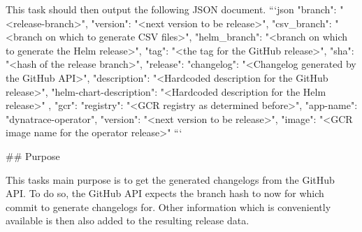 This task should then output the following JSON document.
```json
    {
    "branch": "<release-branch>",
    "version": "<next version to be release>",
    "csv_branch": "<branch on which to generate CSV files>",
    "helm_branch": "<branch on which to generate the Helm release>",
    "tag": "<the tag for the GitHub release>",
    "sha": "<hash of the release branch>",
    "release": {
        "changelog": "<Changelog generated by the GitHub API>",
        "description": "<Hardcoded description for the GitHub release>",
        "helm-chart-description": "<Hardcoded description for the Helm release>"
    },
    "gcr": {
        "registry": "<GCR registry as determined before>",
        "app-name": "dynatrace-operator",
        "version": "<next version to be release>",
        "image": "<GCR image name for the operator release>"
    }
}
```

## Purpose

This tasks main purpose is to get the generated changelogs from the GitHub API.
To do so, the GitHub API expects the branch hash to now for which commit to generate changelogs for.
Other information which is conveniently available is then also added to the resulting release data.
